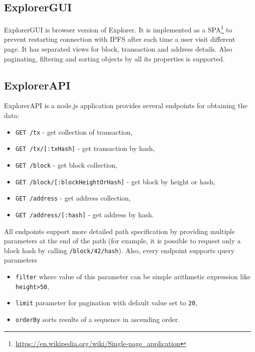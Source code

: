 \subsection{ExplorerGUI}
ExplorerGUI is browser version of Explorer. It is implemented as a SPA\footnote{\url{https://en.wikipedia.org/wiki/Single-page_application}} to prevent restarting connection with IPFS after each time a user visit different page. It has separated views for block, transaction and address details. Also paginating, filtering and sorting objects by all its properties is supported.


\subsection{ExplorerAPI}
\label{explorerAPIroutes}
ExplorerAPI is a node.js application provides several endpoints for obtaining the data:
\begin{itemize}
    \item \texttt{GET /tx} - get collection of transaction, 
    \item \texttt{GET /tx/[:txHash]} - get transaction by hash,
    \item \texttt{GET /block} - get block collection,
    \item \texttt{GET /block/[:blockHeightOrHash]} - get block by height or hash,
    \item \texttt{GET /address} - get address collection,
    \item \texttt{GET /address/[:hash]} - get address by hash.
\end{itemize}
All endpoints support more detailed path specification by providing multiple parameters at the end of the path (for example, it is possible to request only a block hash by calling \texttt{/block/42/hash}). Also, every endpoint supports query parameters
\begin{itemize}
    \item \texttt{filter} where value of this parameter can be simple arithmetic expression like \texttt{height>50},
    \item \texttt{limit} parameter for pagination with default value set to \texttt{20},
    \item \texttt{orderBy} sorts results of a sequence in ascending order.
\end{itemize}
 



